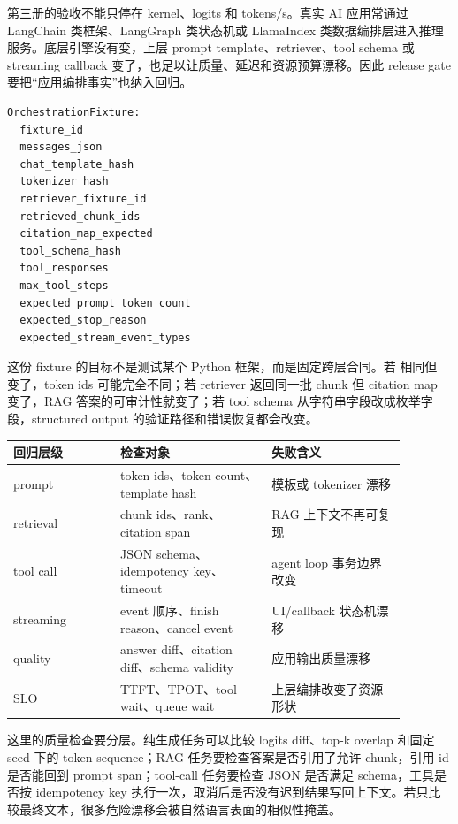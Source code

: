 第三册的验收不能只停在 kernel、logits 和 tokens/s。真实 AI 应用常通过 LangChain 类框架、LangGraph 类状态机或 LlamaIndex 类数据编排层进入推理服务。底层引擎没有变，上层 prompt template、retriever、tool schema 或 streaming callback 变了，也足以让质量、延迟和资源预算漂移。因此 release gate 要把“应用编排事实”也纳入回归。

\begin{lstlisting}[numbers=none,caption={上层编排回归 fixture}]
OrchestrationFixture:
  fixture_id
  messages_json
  chat_template_hash
  tokenizer_hash
  retriever_fixture_id
  retrieved_chunk_ids
  citation_map_expected
  tool_schema_hash
  tool_responses
  max_tool_steps
  expected_prompt_token_count
  expected_stop_reason
  expected_stream_event_types
\end{lstlisting}

这份 fixture 的目标不是测试某个 Python 框架，而是固定跨层合同。若  相同但  变了，token ids 可能完全不同；若 retriever 返回同一批 chunk 但 citation map 变了，RAG 答案的可审计性就变了；若 tool schema 从字符串字段改成枚举字段，structured output 的验证路径和错误恢复都会改变。

\begin{center}
\small
\begin{tabular}{p{0.24\linewidth}p{0.34\linewidth}p{0.30\linewidth}}
\toprule
回归层级 & 检查对象 & 失败含义 \\
\midrule
prompt & token ids、token count、template hash & 模板或 tokenizer 漂移 \\
retrieval & chunk ids、rank、citation span & RAG 上下文不再可复现 \\
tool call & JSON schema、idempotency key、timeout & agent loop 事务边界改变 \\
streaming & event 顺序、finish reason、cancel event & UI/callback 状态机漂移 \\
quality & answer diff、citation diff、schema validity & 应用输出质量漂移 \\
SLO & TTFT、TPOT、tool wait、queue wait & 上层编排改变了资源形状 \\
\bottomrule
\end{tabular}
\end{center}

这里的质量检查要分层。纯生成任务可以比较 logits diff、top-k overlap 和固定 seed 下的 token sequence；RAG 任务要检查答案是否引用了允许 chunk，引用 id 是否能回到 prompt span；tool-call 任务要检查 JSON 是否满足 schema，工具是否按 idempotency key 执行一次，取消后是否没有迟到结果写回上下文。若只比较最终文本，很多危险漂移会被自然语言表面的相似性掩盖。

